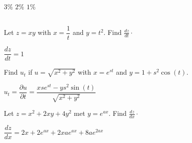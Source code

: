 \begin{Answer}
    \begin{multicols}{3}
    
    \Question $3 \%$
    \Question $2 \%$
    \Question $1 \%$
    \EndCurrentQuestion
    \end{multicols}
\end{Answer}


\subsection*{}

\begin{Exercise}[difficulty = 1]  Let $z = x y$ with $x = \dfrac{1}{t}$ and $ y = t^2$. Find $\frac{dz}{dt}\cdot$ 
\end{Exercise}

\begin{Answer}

    $\dfrac{dz}{dt} = 1$
\end{Answer}

\begin{Exercise}[difficulty = 2] Find $u_t$ if $u = \sqrt{x^2+y^2}$ with $ x=e^{st}$ and $ y= 1+s^2\cos (t)$. 
\end{Exercise}

\begin{Answer}

    $u_t = \dfrac{\partial u}{ \partial t} = \dfrac{xse^{st}-ys^2 \sin (t)}{\sqrt{x^2+y^2}}$
\end{Answer}


\ifanalysis
\begin{Exercise}[difficulty = 2]  Let $z = x^2  + 2 x y + 4 y^2 $ met $y = e^{ax}$. Find $\frac{dz}{dx}\cdot$  
\end{Exercise}

\begin{Answer}

    $\dfrac{dz}{dx} = 2x+2e^{ax} + 2xae^{ax} + 8ae^{2ax} $
\end{Answer}
\fi



